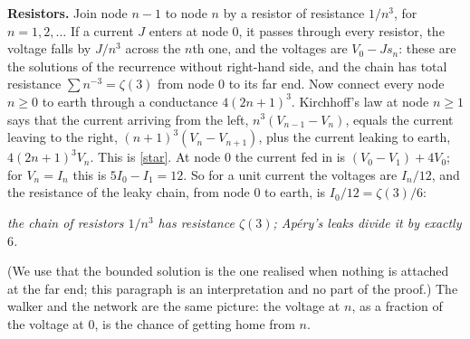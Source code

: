 \documentclass[11pt]{article}
\newcommand{\q}[1]{\medskip\noindent\textbf{#1}}
\begin{document}
\q{Resistors.} Join node $n-1$ to node $n$ by a resistor of resistance $1/n^3$, for
$n=1,2,\dots$ If a current $J$ enters at node $0$, it passes through every resistor, the voltage
falls by $J/n^3$ across the $n$th one, and the voltages are $V_0-Js_n$: these are the solutions of
the recurrence without right-hand side, and the chain has total resistance $\sum n^{-3}=\zeta(3)$ from node $0$ to its far end.
Now connect every node $n\ge0$ to earth through a conductance $4(2n+1)^3$. Kirchhoff's law at node
$n\ge1$ says that the current arriving from the left, $n^3(V_{n-1}-V_n)$, equals the current leaving
to the right, $(n+1)^3(V_n-V_{n+1})$, plus the current leaking to earth, $4(2n+1)^3V_n$. This is
\eqref{star}. At node $0$ the current fed in is $(V_0-V_1)+4V_0$; for $V_n=I_n$ this is
$5I_0-I_1=12$. So for a unit current the voltages are $I_n/12$, and the resistance of the leaky
chain, from node $0$ to earth, is $I_0/12=\zeta(3)/6$:
\begin{center}
\emph{the chain of resistors $1/n^3$ has resistance $\zeta(3)$; Ap\'ery's leaks divide it by exactly $6$.}
\end{center}
(We use that the bounded solution is the one realised when nothing is attached at the far end; this
paragraph is an interpretation and no part of the proof.) The walker and the network are the same
picture: the voltage at $n$, as a fraction of the voltage at $0$, is the chance of getting home
from $n$.
\end{document}
